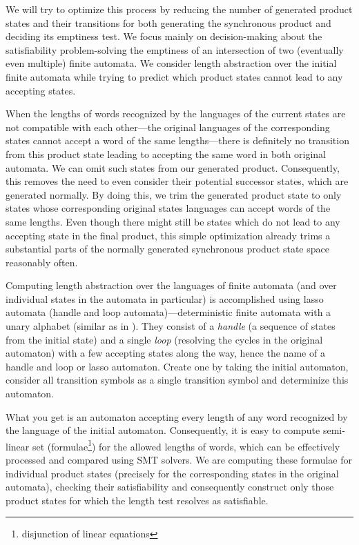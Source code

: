 
We will try to optimize this process by reducing the number of generated product states and their transitions for both generating the synchronous product and deciding its emptiness test. We focus mainly on decision-making about the satisfiability problem-solving the emptiness of an intersection of two (eventually even multiple) finite automata. We consider length abstraction over the initial finite automata while trying to predict which product states cannot lead to any accepting states.

When the lengths of words recognized by the languages of the current states are not compatible with each other---the original languages of the corresponding states cannot accept a word of the same lengths---there is definitely no transition from this product state leading to accepting the same word in both original automata. We can omit such states from our generated product. Consequently, this removes the need to even consider their potential successor states, which are generated normally. By doing this, we trim the generated product state to only states whose corresponding original states languages can accept words of the same lengths. Even though there might still be states which do not lead to any accepting state in the final product, this simple optimization already trims a substantial parts of the normally generated synchronous product state space reasonably often.


Computing length abstraction over the languages of finite automata (and over individual states in the automata in particular) is accomplished using lasso automata (handle and loop automata)---deterministic finite automata with a unary alphabet (similar as in \cite{DBLP:conf/cav/AbdullaACHRRS14}). They consist of a \emph{handle} (a sequence of states from the initial state) and a single \emph{loop} (resolving the cycles in the original automaton) with a few accepting states along the way, hence the name of a handle and loop or lasso automaton. Create one by taking the initial automaton, consider all transition symbols as a single transition symbol and determinize this automaton.

What you get is an automaton accepting every length of any word recognized by the language of the initial automaton. Consequently, it is easy to compute semi-linear set (formulae\footnote{disjunction of linear equations}) for the allowed lengths of words, which can be effectively processed and compared using SMT solvers. We are computing these formulae for individual product states (precisely for the corresponding states in the original automata), checking their satisfiability and consequently construct only those product states for which the length test resolves as satisfiable.

